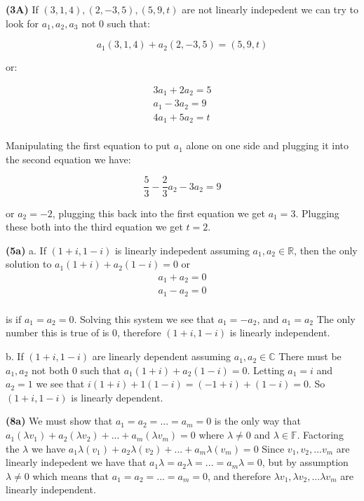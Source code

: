 \documentclass{article}
\begin{document}
\vspace{3mm}

\noindent\textbf{(3A)} If $(3,1,4), (2,-3,5), (5,9,t)$ are not linearly indepedent we can try to look for $a_1, a_2, a_3$ not 0 such that:

$$a_1(3,1,4) + a_2(2,-3,5) = (5,9,t)$$

or:

\begin{gather*}
  3a_1 + 2a_2 = 5\\
  a_1 - 3a_2  = 9 \\
  4a_1 + 5a_2 = t\\
\end{gather*}

Manipulating the first equation to put $a_1$ alone on one side and plugging it into the second equation we have:

$$\frac{5}{3} - \frac{2}{3}a_2 - 3a_2 = 9$$

or $a_2 = -2$, plugging this back into the first equation we get $a_1 = 3$. Plugging these both into the third equation we get $t = 2$.




\vspace{3mm}

\noindent\textbf{(5a)} a. If $(1 + i, 1 - i)$ is linearly indepedent assuming $a_1,a_2 \in \mathbb{R}$, then the only solution to $a_1(1+i) + a_2(1-i) = 0$ or
\begin{gather*}
  a_1 + a_2 = 0 \\
  a_1 - a_2 = 0 \\
\end{gather*}

\noindent is if $a_1 = a_2 = 0$. Solving this system we see that $a_1 = -a_2$, and $a_1 = a_2$ The only number this is true of  is 0, therefore $(1 + i, 1 - i)$ is linearly independent.

\vspace{3mm}

\noindent b. If $(1+i, 1-i)$ are linearly dependent assuming $a_1,a_2 \in \mathbb{C}$ There must be $a_1, a_2$ not both 0 such that $a_1(1+i) + a_2(1-i) = 0$. Letting $a_1 = i$ and $a_2 = 1$ we see that $i(1+i) + 1(1 - i) = (-1 + i) + (1 - i) = 0$. So $(1+i, 1-i)$ is linearly dependent.

\vspace{3mm}

\noindent\textbf{(8a)} We must show that $a_1 = a_2 = ... = a_m = 0$ is the only way that $a_1 (\lambda v_1) + a_2 (\lambda v_2) + ... + a_m (\lambda v_m) = 0$ where $\lambda \neq 0$ and $\lambda \in \mathbb{F}$. Factoring the $\lambda$ we have $a_1 \lambda (v_1) + a_2 \lambda (v_2) + ... + a_m \lambda (v_m) = 0$ Since $v_1, v_2, ... v_m$ are linearly indepedent we have that $a_1 \lambda = a_2 \lambda = ... =a_m \lambda = 0$, but by assumption $\lambda \neq 0$ which means that $a_1 = a_2 = ... = a_m = 0$, and therefore $\lambda v_1, \lambda v_2, ... \lambda v_m$ are linearly independent.
\end{document}
